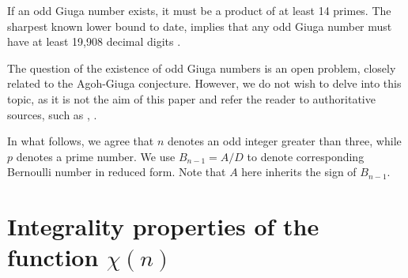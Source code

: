 \documentclass[reqno,a4paper,11pt]{amsart}
\numberwithin{equation}{section}
\theoremstyle{definition}
\begin{document}
If an odd Giuga number exists, it must be a product of at least 14 primes. The sharpest known lower bound to date,  implies that any odd Giuga number must have at least 19,908 decimal digits \cite{Borwein}.

The question of the existence of odd Giuga numbers is an open problem, closely related to the Agoh-Giuga conjecture. 
However, we do not wish to delve into this topic, as it is not the aim of this paper and refer the reader to authoritative sources, such as \cite{Borwein1}, \cite{Kellner1}.



In what follows, we agree that $n$ denotes an odd integer greater than three, while $p$ denotes a prime number. We use  $B_{n-1}=A/D$ to denote  corresponding Bernoulli number in reduced form. Note that $A$ here  inherits the sign of $B_{n-1}$.

\section{Integrality properties  of the function $\chi(n)$}
\end{document}
